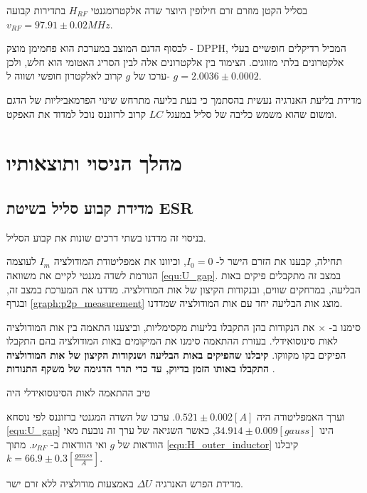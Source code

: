 \documentclass{article}
\begin{document}
בסליל הקטן מוזרם זרם חילופין היוצר שדה אלקטרומגנטי 
$H_{RF}$
בתדירות קבועה
$v_{RF} = 97.91 \pm 0.02 MHz$.

לבסוף הדגם המוצב במערכת הוא פחמימן מוצק -
\textenglish{DPPH},
המכיל רדיקלים חופשיים בעלי אלקטרונים בלתי מזווגים.
הצימוד בין אלקטרונים אלה לבין הסריג האטומי הוא חלש, ולכן ערכו של
$g$
קרוב לאלקטרון חופשי ושווה ל-
$g = 2.0036 \pm 0.0002$.


מדידת בליעת האנרגיה נעשית בהסתמך כי בעת בליעה מתרחש שינוי הפרמאביליות של הדגם ומשום שהוא משמש כליבה של סליל במעגל
$LC$
קרוב לרזוננס נוכל למדוד את האפקט.
\clearpage
\section{מהלך הניסוי ותוצאותיו}
\subsection{מדידת קבוע סליל בשיטת ESR }
בניסוי זה מדדנו בשתי דרכים שונות את קבוע הסליל.


תחילה, קבענו את הזרם הישר ל-
$I_0 = 0$,
וכיוונו את אמפליטודת המודולציה
$I_m$
לעוצמה הגורמת לשדה מגנטי לקיים את משוואה
\ref{equ:U_gap}.
במצב זה מתקבלים פיקים באות הבליעה, במרחקים שווים, ובנקודות הקיצון של אות המודולציה. מדדנו את המערכת במצב זה, ובגרף 
\ref{graph:p2p_measurement}
מוצג אות הבליעה יחד עם אות המודולציה שמדדנו.

סימנו ב-
$\times$
את הנקודות בהן התקבלו בליעות מקסימליות, וביצענו התאמה בין אות המודולציה לאות סינוסואידלי. בעזרת ההתאמה סימנו את המיקומים באות המודולציה בהם התקבלו הפיקים בקו מקווקו.
\textbf{
קיבלנו שהפיקים באות הבליעה ושנקודות הקיצון של אות המודולציה התקבלו באותו הזמן בדיוק, עד כדי תדר הדגימה של משקף התנודות
}.


טיב ההתאמה לאות הסינוסואידלי היה

וערך האמפליטודה היה
$0.521\pm0.002 [A]$.
ערכו של השדה המגנטי ברזוננס לפי נוסחא
\ref{equ:U_gap}
הינו
$34.914\pm0.009 [gauss]$,
כאשר השגיאה של ערך זה נובעת מאי הוודאות של
$g$
ואי הוודאות ב-
$\nu_{RF}$.
מתוך
\ref{equ:H_outer_inductor}
קיבלנו
$k = 66.9\pm 0.3 [\frac{gauss}{A}]$.

\begin{graph}[H]
	\begin{center}
	\resizebox{\textwidth}{!}{}
	\end{center}
	\caption{
	מדידת הפרש האנרגיה
	$\Delta U$
	באמצעות מודולציה ללא זרם ישר.
	}
\label{graph:p2p_measurement}
\end{graph}
\clearpage
\end{document}
